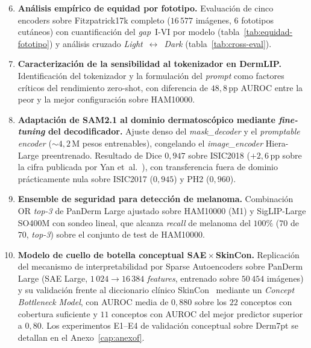 \begin{enumerate}
\setcounter{enumi}{5}
\item \textbf{Análisis empírico de equidad por fototipo.}
Evaluación de cinco encoders sobre Fitzpatrick17k completo
($16\,577$ imágenes, $6$ fototipos cutáneos) con
cuantificación del \emph{gap}~I-VI por modelo
(tabla~\ref{tab:equidad-fototipo}) y análisis cruzado
\emph{Light}~$\leftrightarrow$~\emph{Dark}
(tabla~\ref{tab:cross-eval}).

\item \textbf{Caracterización de la sensibilidad al tokenizador en
DermLIP.} Identificación del tokenizador y la formulación del
\emph{prompt} como factores críticos del rendimiento zero-shot,
con diferencia de $48{,}8$\,pp AUROC entre la peor y la mejor
configuración sobre HAM10000.

\item \textbf{Adaptación de SAM2.1 al dominio dermatoscópico
mediante \emph{fine-tuning} del decodificador.} Ajuste denso del
\emph{mask\_decoder} y el \emph{promptable encoder} ($\sim 4{,}2$\,M
pesos entrenables), congelando el
\emph{image\_encoder} Hiera-Large preentrenado. Resultado de Dice
$0{,}947$ sobre ISIC2018 ($+2{,}6$\,pp sobre la cifra
publicada por Yan et~al.~\cite{panderm2025}), con transferencia
fuera de dominio prácticamente nula sobre ISIC2017 ($0{,}945$)
y PH2 ($0{,}960$).

\item \textbf{Ensemble de seguridad para detección de melanoma.}
Combinación OR \emph{top-3} de PanDerm Large ajustado sobre
HAM10000 (M1) y SigLIP-Large SO400M con sondeo lineal, que alcanza
\emph{recall} de melanoma del $100\%$
($70$ de $70$, \emph{top-3}) sobre el conjunto de test de
HAM10000.

\item \textbf{Modelo de cuello de botella conceptual SAE${}\times{}$SkinCon.}
Replicación del mecanismo de interpretabilidad por Sparse
Autoencoders sobre PanDerm Large (SAE Large,
$1\,024 \to 16\,384$ \emph{features}, entrenado sobre
$50\,454$ imágenes) y su validación frente al diccionario
clínico SkinCon~\cite{skincon} mediante un \emph{Concept
Bottleneck Model}, con AUROC media de $0{,}880$ sobre los
$22$ conceptos con cobertura suficiente y $11$ conceptos con
AUROC del mejor predictor superior a $0{,}80$. Los experimentos
E1--E4 de validación conceptual sobre Derm7pt se detallan en el
Anexo~\ref{cap:anexof}.


\end{enumerate}
